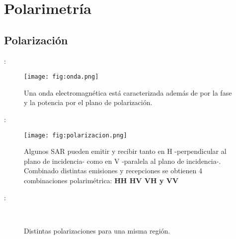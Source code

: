 \section{Polarimetría}
\subsection{Polarización}
\begin{frame}{\secname : \subsecname}
  \begin{figure}
    \centering
    \texttt{[image: fig:onda.png]}
    \caption{Una onda electromagnética está caracterizada además de por la fase y la potencia por el plano de polarización.}
    \label{}
  \end{figure}
\end{frame}

\begin{frame}{\secname : \subsecname}
  \begin{figure}
    \centering
    \texttt{[image: fig:polarizacion.png]}
    \caption{Algunos SAR pueden emitir y recibir tanto en H -perpendicular al plano de incidencia- como en V -paralela al plano de incidencia-. Combinado distintas emisiones y recepciones se obtienen 4 combinaciones polarimétrica: {\bf HH HV VH y VV}}
    \label{}
  \end{figure}
\end{frame}

\begin{frame}{\secname : \subsecname}
  \begin{figure}
    \centering
    \hspace{1cm}
    \\
    \hspace{1cm}
    \caption{Distintas polarizaciones para una misma región.}
  \end{figure}
\end{frame}

